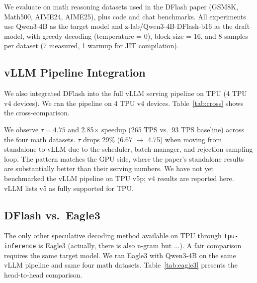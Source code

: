 \documentclass[12pt,letterpaper]{article}
\begin{document}
We evaluate on math reasoning datasets used in the DFlash paper (GSM8K, Math500, AIME24, AIME25), plus code and chat benchmarks. All experiments use Qwen3-4B as the target model and z-lab/Qwen3-4B-DFlash-b16 as the draft model, with greedy decoding (temperature = 0), block size = 16, and 8 samples per dataset (7 measured, 1 warmup for JIT compilation).

\subsection{vLLM Pipeline Integration}

We also integrated DFlash into the full vLLM serving pipeline on TPU (4 TPU v4 devices). We ran the pipeline on 4 TPU v4 devices. Table~\ref{tab:cross} shows the cross-comparison.

\begin{table}[htbp]
\caption{Cross-comparison: standalone TPU, vLLM pipeline TPU, and original DFlash (GPU). The vLLM pipeline shows lower speedup due to scheduling and batch management overhead, not algorithm quality.}
\label{tab:cross}
\resizebox{\linewidth}{!}{}
\end{table}

We observe $\tau=4.75$ and 2.85$\times$ speedup (265 TPS vs.\ 93 TPS baseline) across the four math datasets. $\tau$ drops 29\% (6.67 $\to$ 4.75) when moving from standalone to vLLM due to the scheduler, batch manager, and rejection sampling loop. The pattern matches the GPU side, where the paper's standalone results are substantially better than their serving numbers. We have not yet benchmarked the vLLM pipeline on TPU v5p; v4 results are reported here. vLLM lists v5 as fully supported for TPU.

\subsection{DFlash vs.\ Eagle3}

The only other speculative decoding method available on TPU through \texttt{tpu-inference} is Eagle3 (actually, there is also n-gram but ...). A fair comparison requires the same target model. We ran Eagle3 with Qwen3-4B on the same vLLM pipeline and same four math datasets. Table~\ref{tab:eagle3} presents the head-to-head comparison.

\begin{table}[htbp]
\caption{DFlash vs.\ Eagle3 on the vLLM TPU pipeline, both using Qwen3-4B target. Same baseline; head-to-head comparison.}
\label{tab:eagle3}
\centering
\begin{minipage}{0.45\linewidth}
\centering

\end{minipage}
\end{table}
\end{document}
